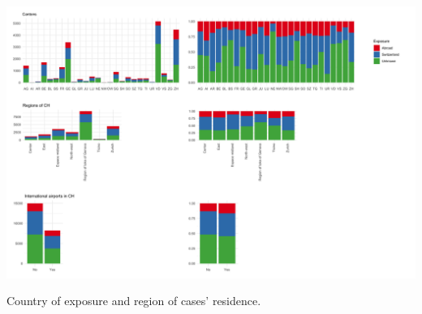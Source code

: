 \documentclass[10pt, a4paper, twoside]{article}
\begin{document}
\clearpage
\begin{suppfigure}[h]
\centering
\includegraphics[scale=0.1]{SF3_2021-06-02.png}
\caption{Country of exposure and region of cases' residence.}
\label{sf3}
\end{suppfigure}
\end{document}
